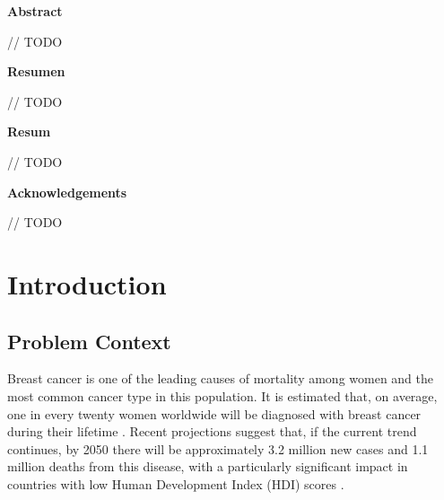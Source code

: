 \documentclass[a4paper,10pt]{book}
\begin{document}
\newpage
{}
\noindent \textbf{\large Abstract}

// TODO


\newpage
{}
\noindent \textbf{\large Resumen}

// TODO


\newpage
{}
\noindent \textbf{\large Resum}

// TODO

\newpage
{}
\noindent \textbf{\large Acknowledgements}

// TODO
 \setcounter{page}{0}
\let\cleardoublepage\clearpage
\tableofcontents
\newpage \thispagestyle{empty}

\pagestyle{fancy}
\newpage \thispagestyle{empty}
\mainmatter
\chapter{Introduction}
\section{Problem Context}

Breast cancer is one of the leading causes of mortality among women and the most common cancer type in this population. It is estimated that, on average, one in every twenty women worldwide will be diagnosed with breast cancer during their lifetime \cite{kim_global_2025}. Recent projections suggest that, if the current trend continues, by 2050 there will be approximately 3.2 million new cases and 1.1 million deaths from this disease, with a particularly significant impact in countries with low Human Development Index (HDI) scores \cite{kim_global_2025}.
\end{document}
